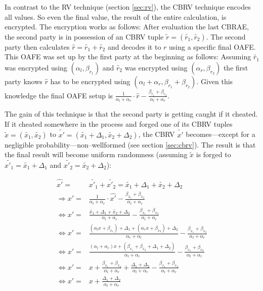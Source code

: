 In contrast to the RV technique (section \ref{sec:rv}), the
CBRV technique encodes all values. So even the final value, the result of the
entire calculation, is encrypted. The encryption works as follows: After
evaluation the last CBRAE, the second party is in possession of an CBRV tuple
$\widetilde{r} = (\widetilde{r_1}, \widetilde{r_2})$. The second party then
calculates $\widehat{r} = \widetilde{r_1} + \widetilde{r_2}$ and decodes it to
$r$ using a specific final OAFE. This OAFE was set up by the first party at the
beginning as follows: Assuming $\widetilde{r_1}$ was encrypted using $(\alpha_l,
\beta_{r_1})$ and $\widetilde{r_2}$ was encrypted using $(\alpha_r,
\beta_{r_2})$ the first party knows $\widehat{r}$ has to be encrypted using
$(\alpha_l + \alpha_r, \beta_{r_1} + \beta_{r_2})$. Given this knowledge the
final OAFE setup is $\frac{1}{\alpha_l + \alpha_r} \cdot \widehat{r} -
\frac{\beta_{r_1} + \beta_{r_2}}{\alpha_l + \alpha_r}$.

The gain of this technique is that the second party is getting caught if it
cheated. If it cheated somewhere in the process and forged one of its CBRV
tuples $\widetilde{x} = (\widetilde{x_1}, \widetilde{x_2})$ to $\widetilde{x'} =
(\widetilde{x_1} + \Delta_1, \widetilde{x_2} + \Delta_2)$, the CBRV
$\widetilde{x'}$ becomes---except for a negligible probability---non--wellformed
(see section \ref{sec:cbrv}). The result is that the final
result will become uniform randomness (assuming $\widetilde{x}$ is forged to
$\widetilde{x'_1} = \widetilde{x_1} + \Delta_1$ and $\widetilde{x'_2} =
\widetilde{x_2} + \Delta_2$):

\begin{align*}
  \widehat{x'} = & \widetilde{x'_1} + \widetilde{x'_2} = \widetilde{x_1} +
  \Delta_1 + \widetilde{x_2} + \Delta_2 \\
  \Rightarrow x' = & \frac{1}{\alpha_l + \alpha_r} \cdot \widehat{x'} -
  \frac{\beta_{x_1} +
  \beta_{x_2}}{\alpha_l + \alpha_r} \\
  \Leftrightarrow x' = & \frac{\widetilde{x_1} + \Delta_1 +
  \widetilde{x_2} + \Delta_2}{\alpha_l + \alpha_r} -
  \frac{\beta_{x_1} +\beta_{x_2}}{\alpha_l + \alpha_r}\\
  \Leftrightarrow x' = & \frac{(\alpha_l x + \beta_{x_1}) + \Delta_1 +
  (\alpha_r x + \beta_{x_2}) + \Delta_2}{\alpha_r + \alpha_l} -
  \frac{\beta_{x_1} +\beta_{x_2}}{\alpha_l + \alpha_r} \\
  \Leftrightarrow x' = & \frac{(\alpha_l+\alpha_r)x + (\beta_{x_1}+\beta_{x_2} +
  \Delta_1+\Delta_2)}{\alpha_l+\alpha_r} -
  \frac{\beta_{x_1} +\beta_{x_2}}{\alpha_l + \alpha_r} \\
  \Leftrightarrow x' = & x + \frac{\beta_{x_1}+\beta_{x_2}}{\alpha_l+\alpha_r}
  + \frac{\Delta_1 + \Delta_2}{\alpha_l + \alpha_r} -
  \frac{\beta_{x_1}+\beta_{x_2}}{\alpha_l + \alpha_r} \\
  \Leftrightarrow x' = & x + \frac{\Delta_1 + \Delta_2}{\alpha_l + \alpha_r}
\end{align*}


